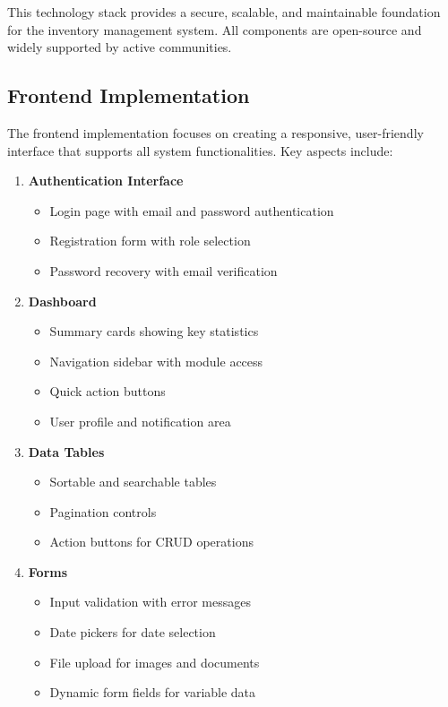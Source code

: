 This technology stack provides a secure, scalable, and maintainable foundation for the inventory management system. All components are open-source and widely supported by active communities.

\subsection{Frontend Implementation}

The frontend implementation focuses on creating a responsive, user-friendly interface that supports all system functionalities. Key aspects include:

\begin{enumerate}
    \item \textbf{Authentication Interface}
    \begin{itemize}
        \item Login page with email and password authentication
        \item Registration form with role selection
        \item Password recovery with email verification
    \end{itemize}

    \item \textbf{Dashboard}
    \begin{itemize}
        \item Summary cards showing key statistics
        \item Navigation sidebar with module access
        \item Quick action buttons
        \item User profile and notification area
    \end{itemize}

    \item \textbf{Data Tables}
    \begin{itemize}
        \item Sortable and searchable tables
        \item Pagination controls
        \item Action buttons for CRUD operations
    \end{itemize}

    \item \textbf{Forms}
    \begin{itemize}
        \item Input validation with error messages
        \item Date pickers for date selection
        \item File upload for images and documents
        \item Dynamic form fields for variable data
    \end{itemize}
\end{enumerate}

